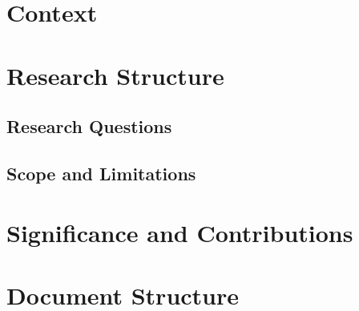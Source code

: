 \section[Context]{Context}

\section[Research Structure]{Research Structure}
\subsection[Research Questions]{Research Questions}
\subsection[Scope and Limitations]{Scope and Limitations}
\section[Significance and Contributions]{Significance and Contributions}
\section[Document Structure]{Document Structure}